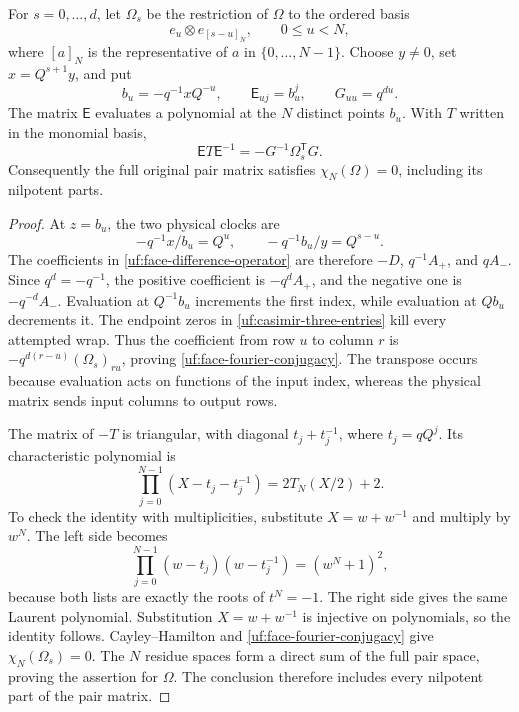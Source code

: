 \begin{proposition}
\label{prop:local-face-fourier}
For \(s=0,\ldots,d\), let \(\Omega_s\) be the restriction of
\(\Omega\) to the ordered basis
\[
 e_u\otimes e_{[s-u]_N},\qquad 0\le u<N,
\]
where \([a]_N\) is the representative of \(a\) in
\(\{0,\ldots,N-1\}\). Choose \(y\ne0\), set
\(x=Q^{s+1}y\), and put
\[
 b_u=-q^{-1}xQ^{-u},\qquad
 \mathsf E_{uj}=b_u^j,\qquad
 G_{uu}=q^{du}.
\]
The matrix \(\mathsf E\) evaluates a polynomial at the \(N\)
distinct points \(b_u\). With \(T\) written in the monomial basis,
\begin{equation}\label{uf:face-fourier-conjugacy}
 \mathsf E T\mathsf E^{-1}=-G^{-1}\Omega_s^{\mathsf T}G.
\end{equation}
Consequently the full original pair matrix satisfies
\(\chi_N(\Omega)=0\), including its nilpotent parts.
\end{proposition}

\begin{proof}
At \(z=b_u\), the two physical clocks are
\[
 -q^{-1}x/b_u=Q^u,\qquad
 -q^{-1}b_u/y=Q^{s-u}.
\]
The coefficients in \eqref{uf:face-difference-operator} are therefore
\(-D\), \(q^{-1}A_+\), and \(qA_-\). Since
\(q^d=-q^{-1}\), the positive coefficient is
\(-q^dA_+\), and the negative one is \(-q^{-d}A_-\).
Evaluation at \(Q^{-1}b_u\) increments the first index, while
evaluation at \(Qb_u\) decrements it. The endpoint zeros in
\eqref{uf:casimir-three-entries} kill every attempted wrap.
Thus the coefficient from row \(u\) to column \(r\) is
\(-q^{d(r-u)}(\Omega_s)_{ru}\), proving
\eqref{uf:face-fourier-conjugacy}. The transpose occurs because
evaluation acts on functions of the input index, whereas the physical
matrix sends input columns to output rows.

The matrix of \(-T\) is triangular, with diagonal
\(t_j+t_j^{-1}\), where \(t_j=qQ^j\). Its characteristic
polynomial is
\[
 \prod_{j=0}^{N-1}(X-t_j-t_j^{-1})=2T_N(X/2)+2.
\]
To check the identity with multiplicities, substitute \(X=w+w^{-1}\)
and multiply by \(w^N\). The left side becomes
\[
 \prod_{j=0}^{N-1}(w-t_j)(w-t_j^{-1})=(w^N+1)^2,
\]
because both lists are exactly the roots of \(t^N=-1\).
The right side gives the same Laurent polynomial. Substitution
\(X=w+w^{-1}\) is injective on polynomials, so the identity follows.
Cayley--Hamilton and \eqref{uf:face-fourier-conjugacy} give
\(\chi_N(\Omega_s)=0\). The \(N\) residue spaces form a direct sum
of the full pair space, proving the assertion for \(\Omega\).
The conclusion therefore includes every nilpotent part of the pair matrix.
\end{proof}

